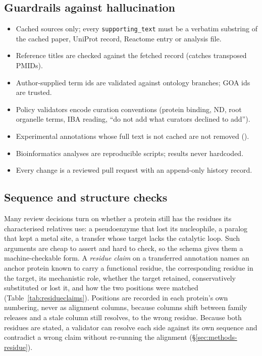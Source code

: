 \subsection{Guardrails against hallucination}
\begin{itemize}[nosep]
  \item Cached sources only; every \texttt{supporting\_text} must be a verbatim substring of the
        cached paper, UniProt record, Reactome entry or analysis file.
  \item Reference titles are checked against the fetched record (catches transposed PMIDs).
  \item Author-supplied term ids are validated against ontology branches; GOA ids are trusted.
  \item Policy validators encode curation conventions (protein binding, ND, root organelle
        terms, IBA reading, ``do not add what curators declined to add'').
  \item Experimental annotations whose full text is not cached are not removed ().
  \item Bioinformatics analyses are reproducible scripts; results never hardcoded.
  \item Every change is a reviewed pull request with an append-only history record.
\end{itemize}

\subsection{Sequence and structure checks}\label{sec:seqchecks}
Many review decisions turn on whether a protein still has the residues its characterised relatives use:
a pseudoenzyme that lost its nucleophile, a paralog that kept a metal site, a transfer whose target
lacks the catalytic loop. Such arguments are cheap to assert and hard to check, so the schema gives them
a machine-checkable form. A \emph{residue claim} on a transferred annotation names an anchor protein
known to carry a functional residue, the corresponding residue in the target, its mechanistic role,
whether the target retained, conservatively substituted or lost it, and how the two positions were
matched (Table~\ref{tab:residueclaims}). Positions are recorded in each protein's own numbering, never
as alignment columns, because columns shift between family releases and a stale column still resolves,
to the wrong residue. Because both residues are stated, a validator can resolve each side against its own
sequence and contradict a wrong claim without re-running the alignment (\S\ref{sec:methods-residue}).

